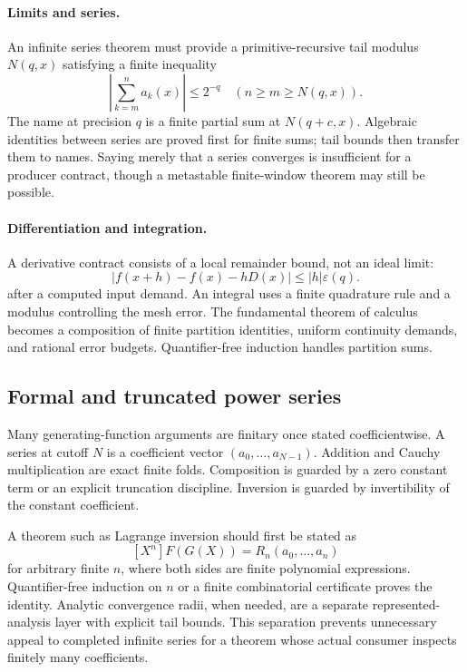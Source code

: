 \paragraph{Limits and series.}
An infinite series theorem must provide a primitive-recursive tail modulus
\(N(q,x)\) satisfying a finite inequality
\[
 \left|\sum_{k=m}^{n}a_k(x)\right|\le 2^{-q}
 \quad(n\ge m\ge N(q,x)).
\]
The name at precision \(q\) is a finite partial sum at \(N(q+c,x)\).  Algebraic identities between series
are proved first for finite sums; tail bounds then transfer them to names.  Saying merely that a series
converges is insufficient for a producer contract, though a metastable finite-window theorem may still be
possible.

\paragraph{Differentiation and integration.}
A derivative contract consists of a local remainder bound, not an ideal limit:
\[
 |f(x+h)-f(x)-hD(x)|\le |h|\varepsilon(q).
\]
after a computed input demand.  An integral uses a finite quadrature rule and a modulus controlling the
mesh error.  The fundamental theorem of calculus becomes a composition of finite partition identities,
uniform continuity demands, and rational error budgets.  Quantifier-free induction handles partition sums.

\subsection{Formal and truncated power series}

Many generating-function arguments are finitary once stated coefficientwise.  A series at cutoff \(N\) is
a coefficient vector \((a_0,\ldots,a_{N-1})\).  Addition and Cauchy multiplication are exact finite folds.
Composition is guarded by a zero constant term or an explicit truncation discipline.  Inversion is guarded
by invertibility of the constant coefficient.

A theorem such as Lagrange inversion should first be stated as
\[
 [X^n]F(G(X))=R_n(a_0,\ldots,a_n)
\]
for arbitrary finite \(n\), where both sides are finite polynomial expressions.  Quantifier-free induction
on \(n\) or a finite combinatorial certificate proves the identity.  Analytic convergence radii, when
needed, are a separate represented-analysis layer with explicit tail bounds.  This separation prevents
unnecessary appeal to completed infinite series for a theorem whose actual consumer inspects finitely many
coefficients.

